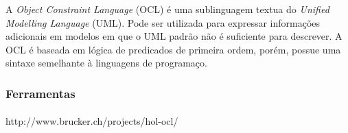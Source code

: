 A \textit{Object Constraint Language} (OCL) é uma sublinguagem textua do \textit{Unified Modelling Language} (UML).
Pode ser utilizada para expressar informações adicionais em modelos em que o UML padrão não é suficiente para
descrever. A OCL é baseada em lógica de predicados de primeira ordem, porém, possue uma sintaxe semelhante à
linguagens de programaço.

\subsubsection{Ferramentas}
\paragraph{}
http://www.brucker.ch/projects/hol-ocl/
\lipsum[1]
